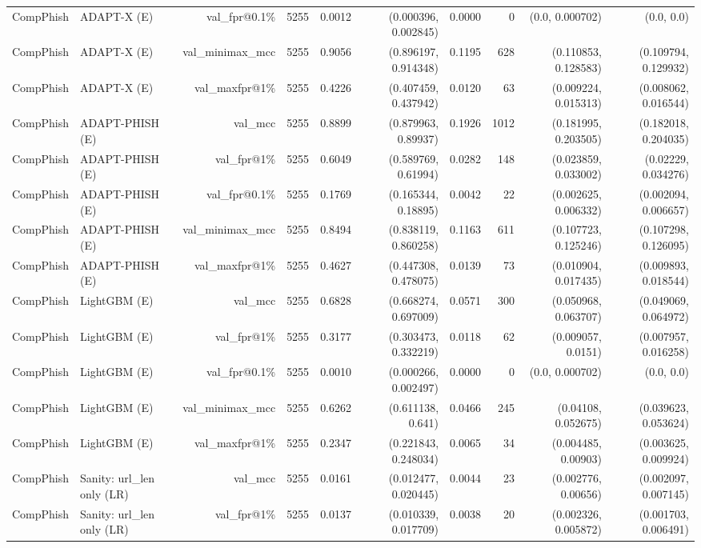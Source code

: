 \begin{table}[t]
\begin{tabular}{llrrrrrrrr}
CompPhish & ADAPT-X (E) & val\_fpr@0.1\% & 5255 & 0.0012 & (0.000396, 0.002845) & 0.0000 & 0 & (0.0, 0.000702) & (0.0, 0.0) \\
CompPhish & ADAPT-X (E) & val\_minimax\_mcc & 5255 & 0.9056 & (0.896197, 0.914348) & 0.1195 & 628 & (0.110853, 0.128583) & (0.109794, 0.129932) \\
CompPhish & ADAPT-X (E) & val\_maxfpr@1\% & 5255 & 0.4226 & (0.407459, 0.437942) & 0.0120 & 63 & (0.009224, 0.015313) & (0.008062, 0.016544) \\
CompPhish & ADAPT-PHISH (E) & val\_mcc & 5255 & 0.8899 & (0.879963, 0.89937) & 0.1926 & 1012 & (0.181995, 0.203505) & (0.182018, 0.204035) \\
CompPhish & ADAPT-PHISH (E) & val\_fpr@1\% & 5255 & 0.6049 & (0.589769, 0.61994) & 0.0282 & 148 & (0.023859, 0.033002) & (0.02229, 0.034276) \\
CompPhish & ADAPT-PHISH (E) & val\_fpr@0.1\% & 5255 & 0.1769 & (0.165344, 0.18895) & 0.0042 & 22 & (0.002625, 0.006332) & (0.002094, 0.006657) \\
CompPhish & ADAPT-PHISH (E) & val\_minimax\_mcc & 5255 & 0.8494 & (0.838119, 0.860258) & 0.1163 & 611 & (0.107723, 0.125246) & (0.107298, 0.126095) \\
CompPhish & ADAPT-PHISH (E) & val\_maxfpr@1\% & 5255 & 0.4627 & (0.447308, 0.478075) & 0.0139 & 73 & (0.010904, 0.017435) & (0.009893, 0.018544) \\
CompPhish & LightGBM (E) & val\_mcc & 5255 & 0.6828 & (0.668274, 0.697009) & 0.0571 & 300 & (0.050968, 0.063707) & (0.049069, 0.064972) \\
CompPhish & LightGBM (E) & val\_fpr@1\% & 5255 & 0.3177 & (0.303473, 0.332219) & 0.0118 & 62 & (0.009057, 0.0151) & (0.007957, 0.016258) \\
CompPhish & LightGBM (E) & val\_fpr@0.1\% & 5255 & 0.0010 & (0.000266, 0.002497) & 0.0000 & 0 & (0.0, 0.000702) & (0.0, 0.0) \\
CompPhish & LightGBM (E) & val\_minimax\_mcc & 5255 & 0.6262 & (0.611138, 0.641) & 0.0466 & 245 & (0.04108, 0.052675) & (0.039623, 0.053624) \\
CompPhish & LightGBM (E) & val\_maxfpr@1\% & 5255 & 0.2347 & (0.221843, 0.248034) & 0.0065 & 34 & (0.004485, 0.00903) & (0.003625, 0.009924) \\
CompPhish & Sanity: url\_len only (LR) & val\_mcc & 5255 & 0.0161 & (0.012477, 0.020445) & 0.0044 & 23 & (0.002776, 0.00656) & (0.002097, 0.007145) \\
CompPhish & Sanity: url\_len only (LR) & val\_fpr@1\% & 5255 & 0.0137 & (0.010339, 0.017709) & 0.0038 & 20 & (0.002326, 0.005872) & (0.001703, 0.006491) \\

\end{tabular}
\end{table}
